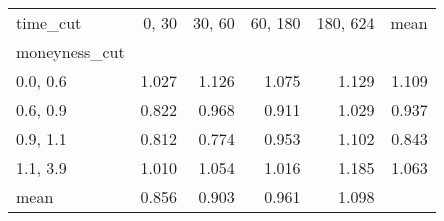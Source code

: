 \begin{tabular}{lrrrrr}
\toprule
time\_cut &  0, 30 &  30, 60 &  60, 180 &  180, 624 &  mean \\
moneyness\_cut &          &           &            &             &       \\
\midrule
0.0, 0.6    &    1.027 &     1.126 &      1.075 &       1.129 & 1.109 \\
0.6, 0.9    &    0.822 &     0.968 &      0.911 &       1.029 & 0.937 \\
0.9, 1.1    &    0.812 &     0.774 &      0.953 &       1.102 & 0.843 \\
1.1, 3.9    &    1.010 &     1.054 &      1.016 &       1.185 & 1.063 \\
mean          &    0.856 &     0.903 &      0.961 &       1.098 &       \\
\bottomrule
\end{tabular}
